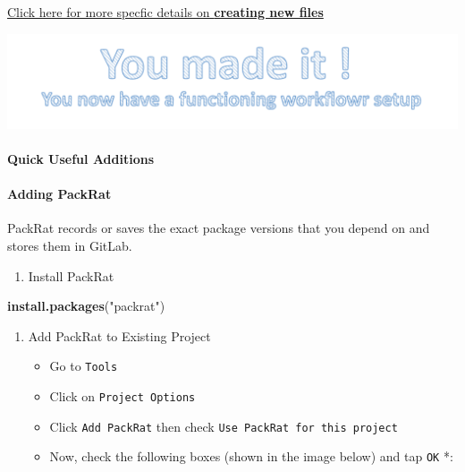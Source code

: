 \documentclass[openany]{article}
\newenvironment{Shaded}{\begin{snugshade}}{\end{snugshade}}
\newcommand{\KeywordTok}[1]{\textcolor[rgb]{0.13,0.29,0.53}{\textbf{#1}}}
\newcommand{\NormalTok}[1]{#1}
\newcommand{\StringTok}[1]{\textcolor[rgb]{0.31,0.60,0.02}{#1}}
\providecommand{\tightlist}{%
  \setlength{\itemsep}{0pt}\setlength{\parskip}{0pt}}
\let\oldparagraph\paragraph
\renewcommand{\paragraph}[1]{\oldparagraph{#1}\mbox{}}
\begin{document}
\protect\hyperlink{adding-new-files}{Click here for more specfic details on \textbf{creating new files}}

\begin{center}\includegraphics[width=0.7\linewidth]{images/Workflow_Photos/uMadeIt2} \end{center}

\hypertarget{quick-useful-additions}{%
\paragraph{Quick Useful Additions}\label{quick-useful-additions}}

\hypertarget{adding-packrat}{%
\paragraph{Adding PackRat}\label{adding-packrat}}

PackRat records or saves the exact package versions that you depend on and stores them in GitLab.

\begin{enumerate}
\def\labelenumi{\arabic{enumi}.}
\tightlist
\item
  Install PackRat
\end{enumerate}

\begin{Shaded}
\begin{Highlighting}[]
\KeywordTok{install.packages}\NormalTok{(}\StringTok{"packrat"}\NormalTok{)}
\end{Highlighting}
\end{Shaded}

\begin{enumerate}
\def\labelenumi{\arabic{enumi}.}
\setcounter{enumi}{1}
\item
  Add PackRat to Existing Project

  \begin{itemize}
  \tightlist
  \item
    Go to \texttt{Tools}
  \item
    Click on \texttt{Project\ Options}
  \item
    Click \texttt{Add\ PackRat} then check \texttt{Use\ PackRat\ for\ this\ project}
  \item
    Now, check the following boxes (shown in the image below) and tap \texttt{OK} *:
  \end{itemize}
\end{enumerate}
\end{document}
